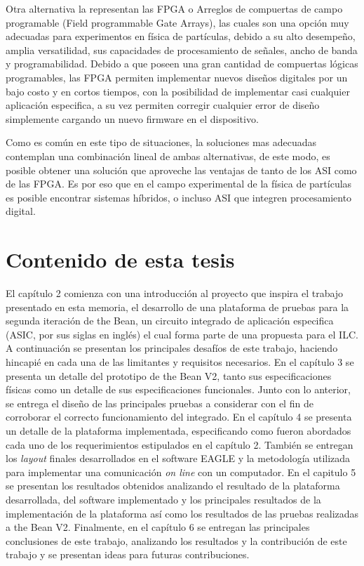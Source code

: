 	Otra alternativa la representan las FPGA o Arreglos de compuertas de campo programable (Field programmable Gate Arrays), las cuales son una opción muy adecuadas para experimentos en física de partículas,  debido a su alto desempeño, amplia versatilidad, sus capacidades de procesamiento de señales, ancho de banda y programabilidad. Debido a que poseen una gran cantidad de  compuertas lógicas programables, las FPGA permiten implementar nuevos diseños digitales por un bajo costo y en cortos tiempos, con la posibilidad de implementar casi cualquier aplicación especifica, a su vez permiten corregir cualquier error de diseño simplemente cargando un nuevo firmware en el dispositivo. \citep{1644925,6341473,4669290}

Como es común en este tipo de situaciones, la soluciones mas adecuadas contemplan una combinación lineal de ambas alternativas, de este modo, es posible obtener una solución que aproveche las ventajas de tanto de los ASI como de las FPGA. Es por eso que en el campo experimental de la física de partículas es posible encontrar sistemas híbridos, o incluso ASI que integren procesamiento digital.



\section{Contenido de esta tesis}
El capítulo 2 comienza con una introducción al proyecto que inspira el trabajo presentado en esta memoria, el desarrollo de una plataforma de pruebas para la segunda iteración de the Bean, un circuito integrado de aplicación especifica (ASIC, por sus siglas en inglés) el cual forma parte de una propuesta para el ILC. A continuación se presentan los principales desafíos de este trabajo, haciendo hincapié en cada una de las limitantes y requisitos necesarios. En el capítulo 3 se presenta un detalle del prototipo de the Bean V2, tanto sus especificaciones físicas como un detalle de sus especificaciones funcionales. Junto con lo anterior, se entrega el diseño de las principales pruebas a considerar con el fin de corroborar el correcto funcionamiento del integrado. En el capítulo 4 se presenta un detalle de la plataforma implementada, especificando como fueron abordados cada uno de los requerimientos estipulados en el capítulo 2. También se entregan los \textit{layout} finales desarrollados en el software EAGLE y la metodología utilizada para implementar una comunicación \textit{on line} con un computador. En el capitulo 5 se presentan los resultados obtenidos analizando el resultado de la plataforma desarrollada, del software implementado y los principales resultados de la implementación de la plataforma así como los resultados de las pruebas realizadas a the Bean V2. Finalmente, en el capítulo 6 se entregan las principales conclusiones de este trabajo, analizando los resultados y la contribución de este trabajo y se presentan ideas para futuras contribuciones.  